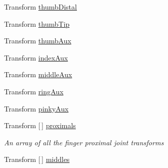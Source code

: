 \begin{DoxyCompactItemize}
\item 
Transform \mbox{\hyperlink{class_valve_1_1_v_r_1_1_steam_v_r___behaviour___skeleton_aa96513bac092633fa9ca053910ac0452}{thumb\+Distal}}
\item 
Transform \mbox{\hyperlink{class_valve_1_1_v_r_1_1_steam_v_r___behaviour___skeleton_a10102566ddcb1cc4433783e5d90e4f76}{thumb\+Tip}}
\item 
Transform \mbox{\hyperlink{class_valve_1_1_v_r_1_1_steam_v_r___behaviour___skeleton_a8cf7a616530313d0468173493a6ccbaf}{thumb\+Aux}}
\item 
Transform \mbox{\hyperlink{class_valve_1_1_v_r_1_1_steam_v_r___behaviour___skeleton_a2b5eaaf9e5b19bb7c5246de93e13352d}{index\+Aux}}
\item 
Transform \mbox{\hyperlink{class_valve_1_1_v_r_1_1_steam_v_r___behaviour___skeleton_a4e967943fc3ee292c6c2a2e6b6624f91}{middle\+Aux}}
\item 
Transform \mbox{\hyperlink{class_valve_1_1_v_r_1_1_steam_v_r___behaviour___skeleton_ae4021b8711d0f05ad0de7135432dfe0b}{ring\+Aux}}
\item 
Transform \mbox{\hyperlink{class_valve_1_1_v_r_1_1_steam_v_r___behaviour___skeleton_ae64e059cb3be98770f3408aba2012365}{pinky\+Aux}}
\item 
Transform \mbox{[}$\,$\mbox{]} \mbox{\hyperlink{class_valve_1_1_v_r_1_1_steam_v_r___behaviour___skeleton_a9e3a5208ad5eb483fe1227217ab222e0}{proximals}}
\begin{DoxyCompactList}\small\item\em An array of all the finger proximal joint transforms \end{DoxyCompactList}\item 
Transform \mbox{[}$\,$\mbox{]} \mbox{\hyperlink{class_valve_1_1_v_r_1_1_steam_v_r___behaviour___skeleton_a6631e831fdbb63efeb61435c73278e85}{middles}}

\end{DoxyCompactItemize}
